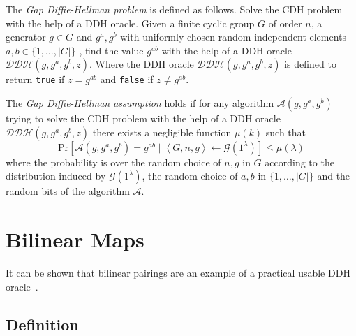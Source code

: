 \begin{defn}[GDH]
\label{def:gdh}
The \textit{Gap Diffie-Hellman problem} is defined as follows. Solve the CDH problem with the help of a DDH oracle. Given a finite cyclic group $G$ of order $n$, a generator $g \in G$ and $g^a, g^b$ with uniformly chosen random independent elements $a, b \in \{ 1, \ldots, | G |\}$ , find the value $g^{ab}$ with the help of a DDH oracle $\mathcal{DDH} \left( g, g^a, g^b, z \right)$. Where the DDH oracle $\mathcal{DDH} \left( g, g^a, g^b, z \right)$ is defined to return \texttt{true} if $z = g^{ab}$ and \texttt{false} if $z \neq g^{ab}$.

The \textit{Gap Diffie-Hellman assumption} holds if for any algorithm $\mathcal{A} \left( g, g^a, g^b \right)$ trying to solve the CDH problem with the help of a DDH oracle $\mathcal{DDH} \left( g, g^a, g^b, z \right)$ there exists a negligible function $\mu \left( k \right)$ such that 
 \begin{equation*}
  \textrm{Pr} \left[ \mathcal{A} \left( g, g^a, g^b \right) = g^{ab} \mid \left< G, n, g \right> \leftarrow \mathcal{G} \left( 1^{\lambda} \right)\right] \leq \mu \left( \lambda \right)
 \end{equation*}
 where the probability is over the random choice of $n, g$ in $G$ according to the distribution induced by $\mathcal{G} \left( 1^{\lambda} \right)$, the random choice of $a, b$ in $\{ 1, \ldots, | G |\}$ and the random bits of the algorithm $\mathcal{A}$.
\end{defn}

\section{Bilinear Maps}
\label{sec:bilinear_map}

It can be shown that bilinear pairings are an example of a practical usable DDH oracle~\cite{art:JouxN03}.

\subsection{Definition}

